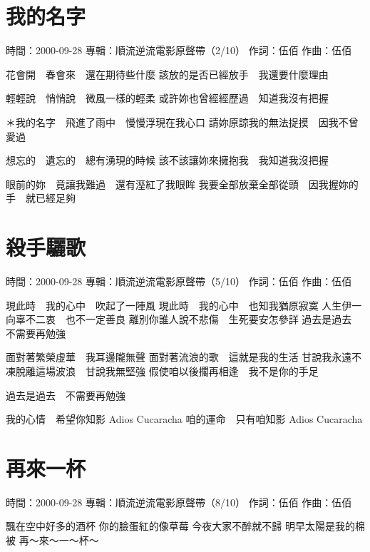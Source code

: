 \documentclass[UTF8,a4paper,oneside,twocolumn,12pt]{ctexbook}
\newcommand{\infopair}[2]{\textbullet #1：#2}
\newcommand{\zc}[1][伍佰]{\infopair{作詞}{#1}}
\newcommand{\zq}[1][伍佰]{\infopair{作曲}{#1}}
\newcommand{\zj}[1]{\infopair{專輯}{#1}}
\newcommand{\sj}[1]{\infopair{時間}{#1}}
\newenvironment{info}{\begin{flushleft}\kaishu
	}
	{\end{flushleft}\normalsize\yahei\par}
\newenvironment{lyric}{
	}
{}
\begin{document}
\section{我的名字}
\begin{info}
	\sj{2000-09-28}
	\zj{順流逆流電影原聲帶（2/10）}
	\zc
	\zq
\end{info}
\begin{lyric}
	花會開　春會來　還在期待些什麼
	該放的是否已經放手　我還要什麼理由

	輕輕說　悄悄說　微風一樣的輕柔
	或許妳也曾經經歷過　知道我沒有把握

	＊我的名字　飛進了雨中　慢慢浮現在我心口
	請妳原諒我的無法捉摸　因我不曾愛過

	想忘的　遺忘的　總有湧現的時候
	該不該讓妳來擁抱我　我知道我沒把握

	眼前的妳　竟讓我難過　還有溼紅了我眼眸
	我要全部放棄全部從頭　因我握妳的手　就已經足夠
\end{lyric}

\section{殺手驪歌}
\begin{info}
	\sj{2000-09-28}
	\zj{順流逆流電影原聲帶（5/10）}
	\zc
	\zq
\end{info}
\begin{lyric}
	現此時　我的心中　吹起了一陣風
	現此時　我的心中　也知我猶原寂寞
	人生伊一向辜不二衷　也不一定善良
	離別你誰人說不悲傷　生死要安怎參詳
	過去是過去　不需要再勉強

	面對著繁榮虛華　我耳邊隴無聲
	面對著流浪的歌　這就是我的生活
	甘說我永遠不凍脫離這場波浪　甘說我無堅強
	假使咱以後擱再相逢　我不是你的手足

	過去是過去　不需要再勉強

	我的心情　希望你知影 Adios Cucaracha
	咱的運命　只有咱知影 Adios Cucaracha
\end{lyric}

\section{再來一杯}
\begin{info}
	\sj{2000-09-28}
	\zj{順流逆流電影原聲帶（8/10）}
	\zc
	\zq
\end{info}
\begin{lyric}
	飄在空中好多的酒杯
	你的臉蛋紅的像草莓
	今夜大家不醉就不歸
	明早太陽是我的棉被
	再～來～一～杯～
\end{lyric}
\end{document}
